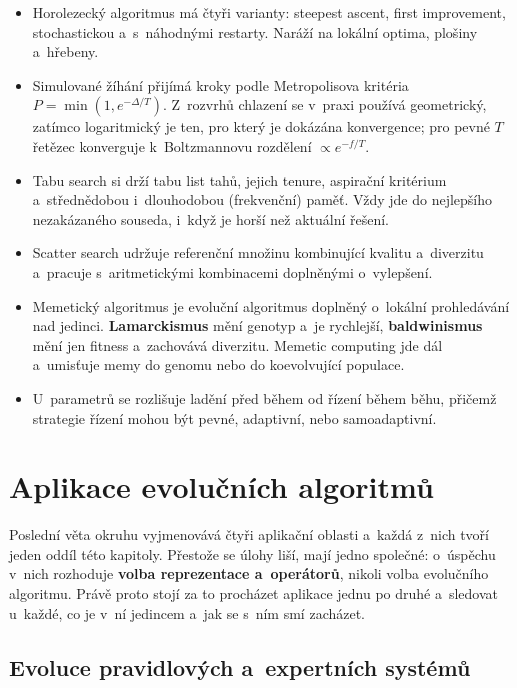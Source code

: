 \documentclass[11pt,a4paper]{article}
\theoremstyle{definition}
\begin{document}
\begin{itemize}
\item Horolezecký algoritmus má čtyři varianty: steepest ascent, first improvement,
  stochastickou a~s~náhodnými restarty. Naráží na lokální optima, plošiny a~hřebeny.
\item Simulované žíhání přijímá kroky podle Metropolisova kritéria
  $P = \min(1, e^{-\Delta/T})$. Z~rozvrhů chlazení se v~praxi používá geometrický,
  zatímco logaritmický je ten, pro který je dokázána konvergence; pro pevné $T$ řetězec
  konverguje k~Boltzmannovu rozdělení $\propto e^{-f/T}$.
\item Tabu search si drží tabu list tahů, jejich tenure, aspirační kritérium
  a~střednědobou i~dlouhodobou (frekvenční) paměť. Vždy jde do nejlepšího nezakázaného
  souseda, i~když je horší než aktuální řešení.
\item Scatter search udržuje referenční množinu kombinující kvalitu a~diverzitu a~pracuje
  s~aritmetickými kombinacemi doplněnými o~vylepšení.
\item Memetický algoritmus je evoluční algoritmus doplněný o~lokální prohledávání nad
  jedinci. \textbf{Lamarckismus} mění genotyp a~je rychlejší, \textbf{baldwinismus} mění
  jen fitness a~zachovává diverzitu. Memetic computing jde dál a~umisťuje memy do genomu
  nebo do koevolvující populace.
\item U~parametrů se rozlišuje ladění před během od řízení během běhu, přičemž strategie
  řízení mohou být pevné, adaptivní, nebo samoadaptivní.
\end{itemize}



\section{Aplikace evolučních algoritmů}
\label{sec:aplikace}

Poslední věta okruhu vyjmenovává čtyři aplikační oblasti a~každá z~nich tvoří jeden oddíl
této kapitoly. Přestože se úlohy liší, mají jedno společné: o~úspěchu v~nich rozhoduje
\textbf{volba reprezentace a~operátorů}, nikoli volba  evolučního algoritmu.
Právě proto stojí za to procházet aplikace jednu po druhé a~sledovat u~každé, co je v~ní
jedincem a~jak se s~ním smí zacházet.

\subsection{Evoluce pravidlových a~expertních systémů}
\label{sec:lcs}
\end{document}
